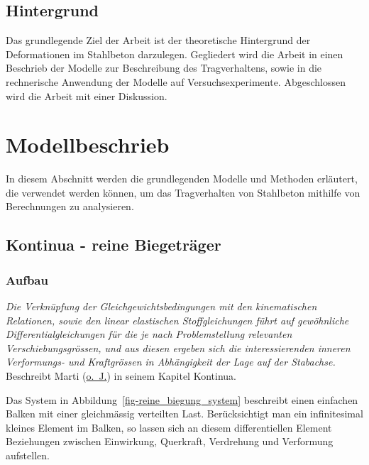 \documentclass[
  letterpaper,
]{scrreprt}
\begin{document}
\hypertarget{hintergrund}{%
\section{Hintergrund}\label{hintergrund}}

Das grundlegende Ziel der Arbeit ist der theoretische Hintergrund der
Deformationen im Stahlbeton darzulegen. Gegliedert wird die Arbeit in
einen Beschrieb der Modelle zur Beschreibung des Tragverhaltens, sowie
in die rechnerische Anwendung der Modelle auf Versuchsexperimente.
Abgeschlossen wird die Arbeit mit einer Diskussion.


\hypertarget{sec-modellbeschrieb}{%
\chapter{Modellbeschrieb}\label{sec-modellbeschrieb}}

In diesem Abschnitt werden die grundlegenden Modelle und Methoden
erläutert, die verwendet werden können, um das Tragverhalten von
Stahlbeton mithilfe von Berechnungen zu analysieren.

\hypertarget{sec-kontinua}{%
\section{Kontinua - reine Biegeträger}\label{sec-kontinua}}

\hypertarget{aufbau}{%
\subsection{Aufbau}\label{aufbau}}

\emph{Die Verknüpfung der Gleichgewichtsbedingungen mit den
kinematischen Relationen, sowie den linear elastischen Stoffgleichungen
führt auf gewöhnliche Differentialgleichungen für die je nach
Problemstellung relevanten Verschiebungsgrössen, und aus diesen ergeben
sich die interessierenden inneren Verformungs- und Kraftgrössen in
Abhängigkeit der Lage auf der Stabachse.} Beschreibt Marti
(\protect\hyperlink{ref-Marti}{o.~J.}) in seinem Kapitel Kontinua.

Das System in Abbildung~\ref{fig-reine_biegung_system} beschreibt einen
einfachen Balken mit einer gleichmässig verteilten Last. Berücksichtigt
man ein infinitesimal kleines Element im Balken, so lassen sich an
diesem differentiellen Element Beziehungen zwischen Einwirkung,
Querkraft, Verdrehung und Verformung aufstellen.
\end{document}
